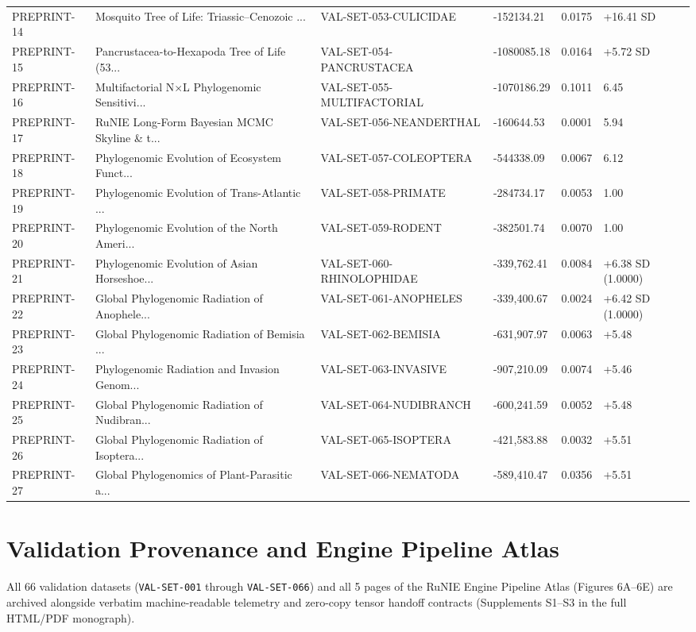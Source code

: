 \documentclass[11pt,twocolumn]{article}
\begin{document}
\begin{table}[t]
\begin{tabular}{llllll}
PREPRINT-14 \cite{white2026_p14} & Mosquito Tree of Life: Triassic--Cenozoic ... & VAL-SET-053-CULICIDAE & -152134.21 & 0.0175 & +16.41 SD \\
PREPRINT-15 \cite{white2026_p15} & Pancrustacea-to-Hexapoda Tree of Life (53... & VAL-SET-054-PANCRUSTACEA & -1080085.18 & 0.0164 & +5.72 SD \\
PREPRINT-16 \cite{white2026_p16} & Multifactorial N$\times$L Phylogenomic Sensitivi... & VAL-SET-055-MULTIFACTORIAL & -1070186.29 & 0.1011 & 6.45 \\
PREPRINT-17 \cite{white2026_p17} & RuNIE Long-Form Bayesian MCMC Skyline \& t... & VAL-SET-056-NEANDERTHAL & -160644.53 & 0.0001 & 5.94 \\
PREPRINT-18 \cite{white2026_p18} & Phylogenomic Evolution of Ecosystem Funct... & VAL-SET-057-COLEOPTERA & -544338.09 & 0.0067 & 6.12 \\
PREPRINT-19 \cite{white2026_p19} & Phylogenomic Evolution of Trans-Atlantic ... & VAL-SET-058-PRIMATE & -284734.17 & 0.0053 & 1.00 \\
PREPRINT-20 \cite{white2026_p20} & Phylogenomic Evolution of the North Ameri... & VAL-SET-059-RODENT & -382501.74 & 0.0070 & 1.00 \\
PREPRINT-21 \cite{white2026_p21} & Phylogenomic Evolution of Asian Horseshoe... & VAL-SET-060-RHINOLOPHIDAE & -339,762.41 & 0.0084 & +6.38 SD (1.0000) \\
PREPRINT-22 \cite{white2026_p22} & Global Phylogenomic Radiation of Anophele... & VAL-SET-061-ANOPHELES & -339,400.67 & 0.0024 & +6.42 SD (1.0000) \\
PREPRINT-23 \cite{white2026_p23} & Global Phylogenomic Radiation of Bemisia ... & VAL-SET-062-BEMISIA & -631,907.97 & 0.0063 & +5.48 \\
PREPRINT-24 \cite{white2026_p24} & Phylogenomic Radiation and Invasion Genom... & VAL-SET-063-INVASIVE & -907,210.09 & 0.0074 & +5.46 \\
PREPRINT-25 \cite{white2026_p25} & Global Phylogenomic Radiation of Nudibran... & VAL-SET-064-NUDIBRANCH & -600,241.59 & 0.0052 & +5.48 \\
PREPRINT-26 \cite{white2026_p26} & Global Phylogenomic Radiation of Isoptera... & VAL-SET-065-ISOPTERA & -421,583.88 & 0.0032 & +5.51 \\
PREPRINT-27 \cite{white2026_p27} & Global Phylogenomics of Plant-Parasitic a... & VAL-SET-066-NEMATODA & -589,410.47 & 0.0356 & +5.51 \\
\bottomrule
\end{tabular}
\end{table}

\section{Validation Provenance and Engine Pipeline Atlas}
All 66 validation datasets (\texttt{VAL-SET-001} through \texttt{VAL-SET-066}) and all 5 pages of the RuNIE Engine Pipeline Atlas (Figures 6A--6E) are archived alongside verbatim machine-readable telemetry and zero-copy tensor handoff contracts (Supplements S1--S3 in the full HTML/PDF monograph).


\end{document}
